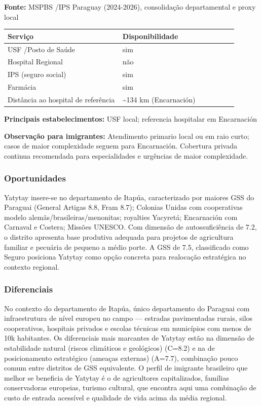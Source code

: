 \textbf{Fonte:} MSPBS /\allowbreak  IPS Paraguay (2024-2026), consolidação
departamental e proxy local

{\def\LTcaptype{none} %
\begin{longtable}{@{}>{\raggedright\arraybackslash}p{0.45\linewidth} >{\raggedright\arraybackslash}p{0.45\linewidth}@{}}
\toprule\noalign{}
Serviço & Disponibilidade \\
\midrule\noalign{}
\endhead
\bottomrule\noalign{}
\endlastfoot
USF /\allowbreak  Posto de Saúde & sim \\
Hospital Regional & não \\
IPS (seguro social) & sim \\
Farmácia & sim \\
Distância ao hospital de referência & \textasciitilde134 km
(Encarnación) \\
\end{longtable}
}

\textbf{Principais estabelecimentos:} USF local; referencia hospitalar
em Encarnación

\textbf{Observação para imigrantes:} Atendimento primario local ou em
raio curto; casos de maior complexidade seguem para Encarnación.
Cobertura privada continua recomendada para especialidades e urgências
de maior complexidade.

\subsubsection*{Oportunidades}\label{oport-yatytay-0727}
Yatytay insere-se no departamento de Itapúa, caracterizado por maiores GSS do Paraguai (General Artigas 8.8, Fram 8.7); Colonias Unidas com cooperativas modelo alemãs/brasileiras/menonitas; royalties Yacyretá; Encarnación com Carnaval e Costera; Missões UNESCO. Com dimensão de autossuficiência de 7.2, o distrito apresenta base produtiva adequada para projetos de agricultura familiar e pecuária de pequeno a médio porte. A GSS de 7.5, classificado como Seguro posiciona Yatytay como opção concreta para realocação estratégica no contexto regional.

\subsubsection*{Diferenciais}\label{dif-yatytay-0727}
No contexto do departamento de Itapúa, único departamento do Paraguai com infraestrutura de nível europeu no campo — estradas pavimentadas rurais, silos cooperativos, hospitais privados e escolas técnicas em municípios com menos de 10k habitantes. Os diferenciais mais marcantes de Yatytay estão na dimensão de estabilidade natural (riscos climáticos e geológicos) (C=8.2) e na de posicionamento estratégico (ameaças externas) (A=7.7), combinação pouco comum entre distritos de GSS equivalente. O perfil de imigrante brasileiro que melhor se beneficia de Yatytay é o de agricultores capitalizados, famílias conservadoras europeias, turismo cultural, que encontra aqui uma combinação de custo de entrada acessível e qualidade de vida acima da média regional.
